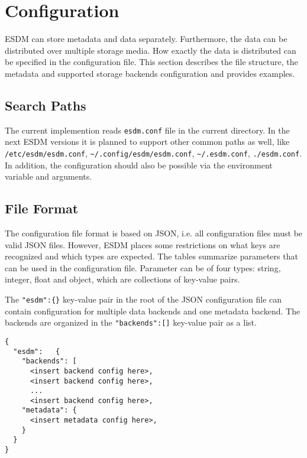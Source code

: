 \section{Configuration}

ESDM can store metadata and data separately.
Furthermore, the data can be distributed over multiple storage media.
How exactly the data is distributed can be specified in the configuration file.
This section describes the file structure, the metadata and supported storage backends configuration and provides examples.

\subsection{Search Paths}

The current implemention reads \lstinline|esdm.conf| file in the current directory.
In the next ESDM versions it is planned to support other common paths as well, like \lstinline|/etc/esdm/esdm.conf|, \lstinline|~/.config/esdm/esdm.conf|, \lstinline|~/.esdm.conf|, \lstinline|./esdm.conf|.
In addition, the configuration should also be possible via the environment variable and arguments.


\subsection{File Format}
The configuration file format is based on JSON, i.e. all configuration files must be valid JSON files.
However, ESDM places some restrictions on what keys are recognized and which types are expected.
The tables summarize parameters that can be used in the configuration file.
Parameter can be of four types: string, integer, float and object, which are collections of key-value pairs.

The \lstinline|"esdm":{}| key-value pair in the root of the JSON configuration file can contain configuration for multiple data backends and one metadata backend.
The backends are organized in the \lstinline|"backends":[]| key-value pair as a list.



\begin{lstlisting}
{
  "esdm":	{
    "backends": [
      <insert backend config here>,
      <insert backend config here>,
      ...
      <insert backend config here>,
    "metadata": {
      <insert metadata config here>,
    }
  }
}
\end{lstlisting}

